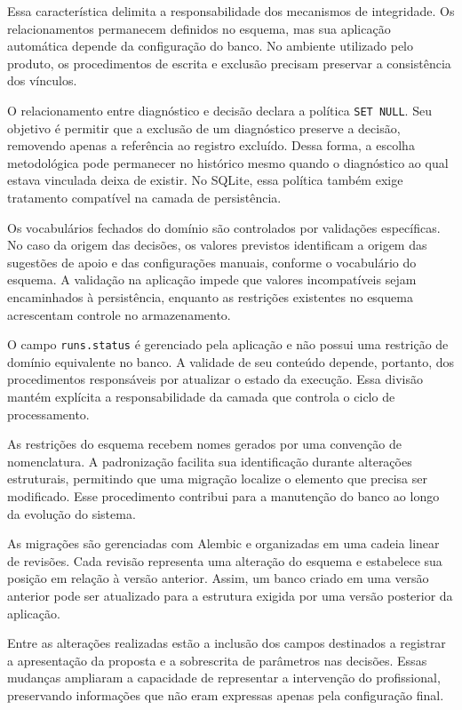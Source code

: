Essa característica delimita a responsabilidade dos mecanismos de integridade. Os relacionamentos permanecem definidos no esquema, mas sua aplicação automática depende da configuração do banco. No ambiente utilizado pelo produto, os procedimentos de escrita e exclusão precisam preservar a consistência dos vínculos.

O relacionamento entre diagnóstico e decisão declara a política \texttt{SET NULL}. Seu objetivo é permitir que a exclusão de um diagnóstico preserve a decisão, removendo apenas a referência ao registro excluído. Dessa forma, a escolha metodológica pode permanecer no histórico mesmo quando o diagnóstico ao qual estava vinculada deixa de existir. No SQLite, essa política também exige tratamento compatível na camada de persistência.

Os vocabulários fechados do domínio são controlados por validações específicas. No caso da origem das decisões, os valores previstos identificam a origem das sugestões de apoio e das configurações manuais, conforme o vocabulário do esquema. A validação na aplicação impede que valores incompatíveis sejam encaminhados à persistência, enquanto as restrições existentes no esquema acrescentam controle no armazenamento.

O campo \texttt{runs.status} é gerenciado pela aplicação e não possui uma restrição de domínio equivalente no banco. A validade de seu conteúdo depende, portanto, dos procedimentos responsáveis por atualizar o estado da execução. Essa divisão mantém explícita a responsabilidade da camada que controla o ciclo de processamento.

As restrições do esquema recebem nomes gerados por uma convenção de nomenclatura. A padronização facilita sua identificação durante alterações estruturais, permitindo que uma migração localize o elemento que precisa ser modificado. Esse procedimento contribui para a manutenção do banco ao longo da evolução do sistema.

As migrações são gerenciadas com Alembic e organizadas em uma cadeia linear de revisões. Cada revisão representa uma alteração do esquema e estabelece sua posição em relação à versão anterior. Assim, um banco criado em uma versão anterior pode ser atualizado para a estrutura exigida por uma versão posterior da aplicação.

Entre as alterações realizadas estão a inclusão dos campos destinados a registrar a apresentação da proposta e a sobrescrita de parâmetros nas decisões. Essas mudanças ampliaram a capacidade de representar a intervenção do profissional, preservando informações que não eram expressas apenas pela configuração final.

